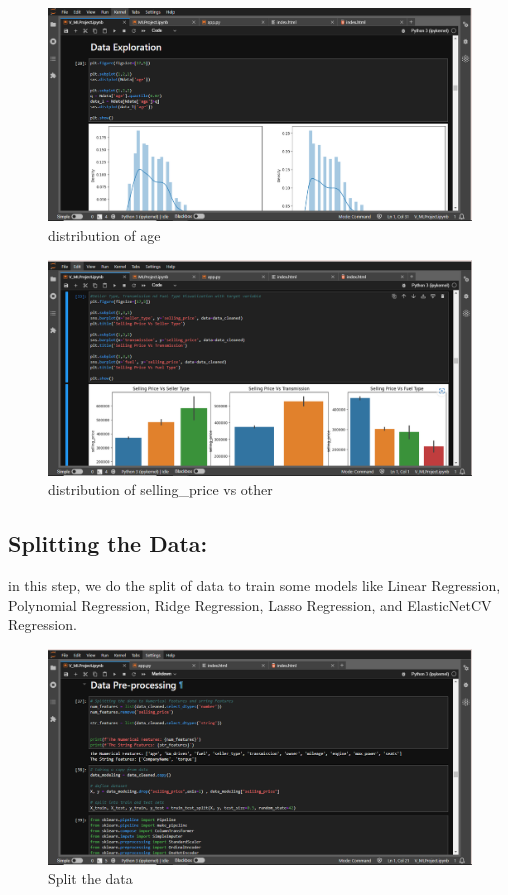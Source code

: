 \documentclass{article}
\begin{document}
\begin{figure}[!h]
    \centering
    \includegraphics[width=\textwidth]{plt-age.png}
    \caption{distribution of age}
    \label{fig:left_image}
\end{figure}
\begin{figure}[!h]
    \centering
    \includegraphics[width=\textwidth]{plt-price.png}
    \caption{distribution of selling\_price vs other}
    \label{fig:right_image}
\end{figure}
    
\subsection{Splitting the Data:}
in this step, we do the split of data to train some models like Linear Regression, Polynomial Regression, Ridge Regression, Lasso Regression, and ElasticNetCV Regression.\\

\begin{figure}[!h]
    \centering
    \includegraphics[width=1\textwidth]{split.png}
    \caption{Split the data}
    \label{fig:my_label}
\end{figure}
\newpage
\end{document}
